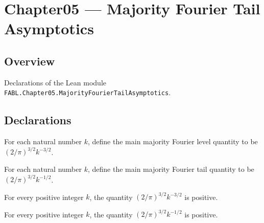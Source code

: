 \chapter{Chapter05 — Majority Fourier Tail Asymptotics}
\section{Overview}

Declarations of the Lean module \texttt{FABL.Chapter05.MajorityFourierTailAsymptotics}.

\section{Declarations}

\begin{definition}
\label{FABL.majorityFourierLevelMain}
\leanok
For each natural number $k$, define the main majority Fourier level quantity to be
$(2/\pi)^{3/2}k^{-3/2}$.
\end{definition}

\begin{definition}
\label{FABL.majorityFourierTailMain}
\leanok
For each natural number $k$, define the main majority Fourier tail quantity to be
$(2/\pi)^{3/2}k^{-1/2}$.
\end{definition}

\begin{theorem}
\label{FABL.majorityFourierLevelMain_pos}
\leanok
{}
For every positive integer $k$, the quantity $(2/\pi)^{3/2}k^{-3/2}$ is positive.
\end{theorem}

\begin{theorem}
\label{FABL.majorityFourierTailMain_pos}
\leanok
{}
For every positive integer $k$, the quantity $(2/\pi)^{3/2}k^{-1/2}$ is positive.
\end{theorem}


